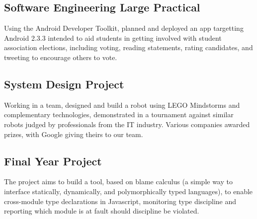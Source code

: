 \documentclass[sans,a4paper]{moderncv}   %
\begin{document}
{%
%
		\subsection{\hspace{-8em}Software Engineering Large Practical}
		Using the Android Developer Toolkit, planned and deployed an app targetting Android 2.3.3 intended to aid students in getting involved with student association elections, including voting, reading statements, rating candidates, and tweeting to encourage others to vote.
%
		\subsection{\hspace{-8em}System Design Project}
		Working in a team, designed and build a robot using LEGO Mindstorms and complementary technologies, demonstrated in a tournament against similar robots judged by professionals from the IT industry. Various companies awarded prizes, with Google giving theirs to our team.
%
		\subsection{\hspace{-8em}Final Year Project}
		The project aims to build a tool, based on blame calculus (a simple way to interface statically, dynamically, and polymorphically typed languages), to enable cross-module type declarations in Javascript, monitoring type discipline and reporting which module is at fault should discipline be violated.
	}
\end{document}
